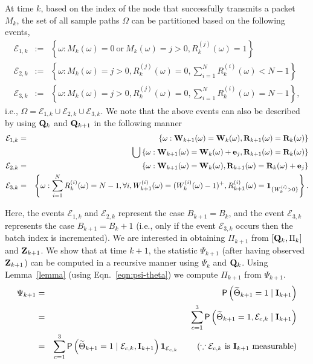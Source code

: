 \documentclass[acmtosn]{acmtrans2m}
\newcommand{\prob}[1]{\mathsf{P}\left(#1\right)}
\newcommand{\nn}{\nonumber \\}
{\theorembodyfont{\rmfamily}
\newtheorem{remarks}{Remark}[section]} \newtheorem{theorem}{Theorem}
\begin{document}
At time $k$, based on the index of the node that successfully transmits
a packet $M_k$, the set of all sample paths $\Omega$ can be partitioned
based on the following events, 
\begin{eqnarray*}
\mathcal{E}_{1,k} & := & \left\{\omega: M_k(\omega)=0 \ \text{or} \
M_k(\omega) = j >0, R_k^{(j)}(\omega) = 1 \right\}\nn 
\mathcal{E}_{2,k} & := & \left\{\omega: 
M_k(\omega) = j >0, R_k^{(j)}(\omega) = 0, \sum_{i=1}^N
R_k^{(i)}(\omega) < N-1 \right\}\nn 
\mathcal{E}_{3,k} & := & \left\{\omega: 
M_k(\omega) = j >0, R_k^{(j)}(\omega) = 0, \sum_{i=1}^N
R_k^{(i)}(\omega) = N-1 \right\},
\end{eqnarray*}
i.e., $\Omega = \mathcal{E}_{1,k} \cup \mathcal{E}_{2,k} \cup \mathcal{E}_{3,k}$.
We note that the above events can also be described by using ${\bf Q}_k$
and ${\bf Q}_{k+1}$ in the following manner
\begin{eqnarray*}
\mathcal{E}_{1,k} & = & 
\left\{\omega: {\bf W}_{k+1}(\omega) = {\bf W}_k(\omega) , {\bf R}_{k+1}(\omega) = {\bf
R}_k(\omega) \right\} \\
& & \bigcup \left\{\omega:  {\bf W}_{k+1}(\omega) = {\bf W}_k(\omega) + {\bf e}_j, {\bf R}_{k+1}(\omega) = {\bf R}_k(\omega)\right\}\nn 
\mathcal{E}_{2,k} & = & \left\{\omega: 
{\bf W}_{k+1}(\omega) = {\bf W}_k(\omega), {\bf R}_{k+1}(\omega) = {\bf
R}_k(\omega) + {\bf e}_j \right\}\nn 
\mathcal{E}_{3,k} & = & \left\{\omega: 
\sum_{i=1}^N R_k^{(i)}(\omega) = N-1,
\forall i, W^{(i)}_{k+1}(\omega) = (W^{(i)}_k(\omega)-1)^+, 
R_{k+1}^{(i)}(\omega) = {\bf 1}_{\{W_k^{(i)}>0\}} 
\right\}.
\end{eqnarray*}


Here, the events $\mathcal{E}_{1,k}$ and $\mathcal{E}_{2,k}$ represent the
case $B_{k+1} = B_k$, and the event $\mathcal{E}_{3,k}$ represents the
case $B_{k+1} = B_k+1$ (i.e., only if the event $\mathcal{E}_{3,k}$
occurs then the batch index is incremented). We are interested in
obtaining $\Pi_{k+1}$ from $[{\bf Q}_k, {\Pi_k}]$ and ${\bf Z}_{k+1}$. 
We show that at time $k+1$, the statistic $\Psi_{k+1}$ (after having observed ${\bf
Z}_{k+1}$) can be computed in a recursive manner using $\Psi_k$ and
${\bf Q}_k$. Using Lemma~\ref{lemma} (using Eqn.~\ref{eqn:psi-theta}) we
compute $\Pi_{k+1}$ from $\Psi_{k+1}$.
\begin{eqnarray*}
\Psi_{k+1}
& = & \prob{\widetilde\Theta_{k+1}=1\mid {\bf I}_{k+1}} \\ 
& = & \sum_{c=1}^3 \prob{\widetilde\Theta_{k+1}=1, \mathcal{E}_{c,k}\mid
{\bf I}_{k+1}}\\  
& = & \sum_{c=1}^3 \prob{\widetilde\Theta_{k+1}=1 \mid \mathcal{E}_{c,k}, 
{\bf I}_{k+1}} {\bf 1}_{\mathcal{E}_{c,k}} \hspace{8mm} (\because \mathcal{E}_{c,k} \ \text{is} \
{\bf I}_{k+1} \ \text{measurable})
\end{eqnarray*}
\end{document}

